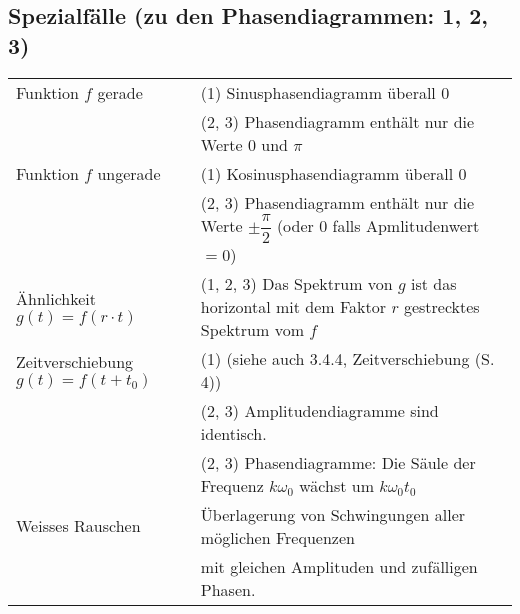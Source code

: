 	\subsection{Spezialfälle (zu den Phasendiagrammen: 1, 2, 3)}
		\begin{tabular}{ll}
			Funktion $f$ gerade & (1) Sinusphasendiagramm überall $0$\\[3pt]
			 & (2, 3) Phasendiagramm enthält nur die Werte $0$ und $\pi$\\[3pt]
	 		Funktion $f$ ungerade & (1) Kosinusphasendiagramm überall $0$\\[3pt]
	 		 & (2, 3) Phasendiagramm enthält nur die Werte $\pm \dfrac{\pi}{2}$ (oder $0$ falls Apmlitudenwert $= 0$)\\[3pt]
	 		Ähnlichkeit $g(t) = f(r \cdot t)$ & (1, 2, 3) Das Spektrum von $g$ ist das horizontal mit dem Faktor $r$ gestrecktes Spektrum vom $f$\\[3pt]
	 		Zeitverschiebung $g(t) = f(t + t_0)$ & (1) (siehe auch 3.4.4, Zeitverschiebung (S. 4))\\[3pt]
	 		 & (2, 3) Amplitudendiagramme sind identisch.\\[3pt]
	 		 & (2, 3) Phasendiagramme: Die Säule der Frequenz $k \omega_0$ wächst um $k \omega_0 t_0$\\[3pt]
	 		Weisses Rauschen & Überlagerung von Schwingungen aller möglichen Frequenzen\\[3pt]
	 		 & mit gleichen Amplituden und zufälligen Phasen.
		\end{tabular}
		